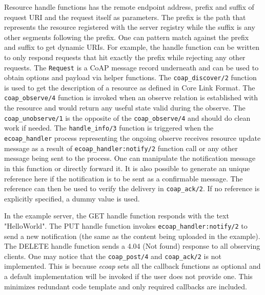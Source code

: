 Resource handle functions has the remote endpoint address, prefix and suffix of request URI and the request itself as parameters. The prefix is the path that represents the resource registered with the server registry while the suffix is any other segments following the prefix. One can pattern match against the prefix and suffix to get dynamic URIs. For example, the handle function can be written to only respond requests that hit exactly the prefix while rejecting any other requests. The \verb|Request| is a CoAP message record underneath and can be used to obtain options and payload via helper functions. The \verb|coap_discover/2| function is used to get the description of a resource as defined in Core Link Format. The \verb|coap_observe/4| function is invoked when an observe relation is established with the resource and would return any useful state valid during the observe. The \verb|coap_unobserve/1| is the opposite of the \verb|coap_observe/4| and should do clean work if needed. The \verb|handle_info/3| function is triggered when the \verb|ecoap_handler| process representing the ongoing observe receives resource update message as a result of \verb|ecoap_handler:notify/2| function call or any other message being sent to the process. One can manipulate the notification message in this function or directly forward it. It is also possible to generate an unique reference here if the notification is to be sent as a confirmable message. The reference can then be used to verify the delivery in \verb|coap_ack/2|. If no reference is explicitly specified, a dummy value is used. 

In the example server, the GET handle function responds with the text "HelloWorld". The PUT handle function invokes \verb|ecoap_handler:notify/2| to send a new notification (the same as the content being uploaded in the example). The DELETE handle function sends a 4.04 (Not found) response to all observing clients. One may notice that the \verb|coap_post/4| and \verb|coap_ack/2| is not implemented. This is because \textit{ecoap} sets all the callback functions as optional and a default implementation will be invoked if the user does not provide one. This minimizes redundant code template and only required callbacks are included.

